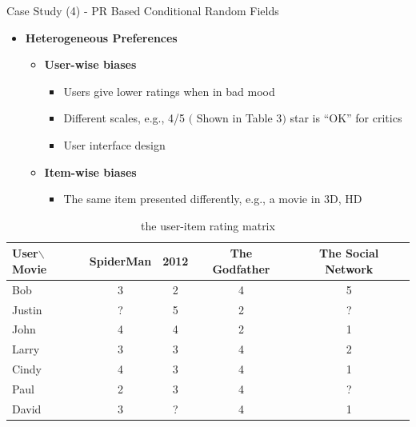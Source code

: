 \documentclass[
 size=14pt,
 paper=smartboard,  %
 mode=present, 		%
 display=slides, 	%
 style=tuliplab,  	%
 pauseslide,
 fleqn,leqno]{powerdot}{}
\begin{document}
\begin{slide}[toc=,bm=]{Case Study (4) - PR Based Conditional Random Fields}
	
	\begin{itemize}
		\item  \textbf{Heterogeneous Preferences}
		
		\begin{itemize}
			\item \textbf{User-wise biases}
			\begin{itemize}
				\item Users give lower ratings when in bad mood
				
				\item Different scales, e.g., 4/5 $($ Shown in Table 3$)$ star is ``OK'' for critics
				
				\item User interface design
				
			\end{itemize}
			
			\item \textbf{Item-wise biases}
			
			\begin{itemize}
				
				\item The same item presented differently,
				e.g., a movie in 3D, HD
				
			\end{itemize}
		\end{itemize}
	\end{itemize}
	
	\vspace*{-45pt}
	\begin{table}[h]
		\fontsize{11pt}{11pt}\selectfont
		\setlength{\abovecaptionskip}{0pt}
		\setlength{\belowcaptionskip}{1pt}
		\centering
		\caption{the user-item rating matrix}
		\begin{threeparttable}
			\begin{tabular}{l|c|c|c|c}	
				\toprule
				\textbf{User$\backslash$Movie}  	&  	\textbf{Spider\-Man}		& 		\textbf{2012} 		& 		\textbf{The Godfather} 		& 	\textbf{The Social Network}\\
				\midrule
				Bob	&	3	&	2 	&	4	&	5	\\
				Justin	&	?	&	5   &	2	&	?	\\
				John	&	4	&	4 	&	2	&	1	\\
				Larry	&	3	&	3 	&	4	&	2	\\
				Cindy	&	4	&	3 	&	4	&	1	\\
				Paul	&	2	&	3 	&	4	&	?	\\
				David	&	3	&	?	&	4	&	1	\\
				\bottomrule
			\end{tabular}
		\end{threeparttable}
		
	\end{table}
	
\end{slide}
\end{document}
